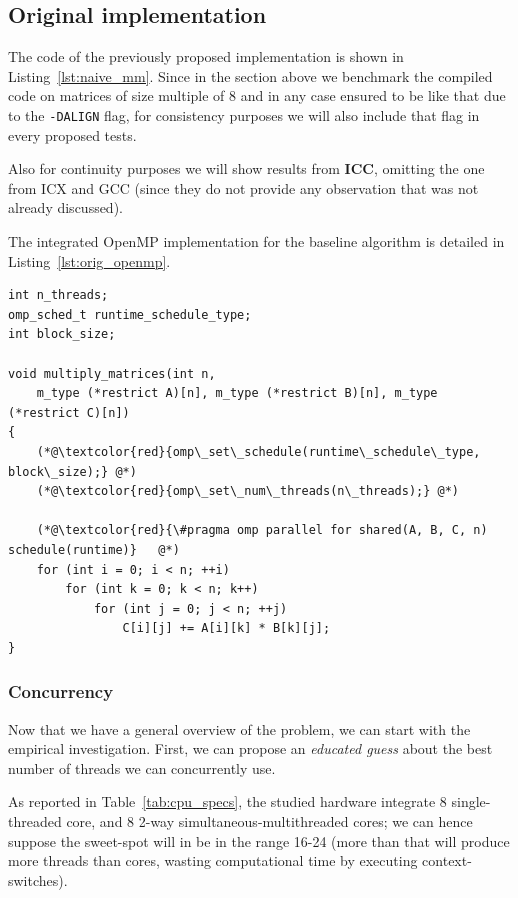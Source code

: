 \subsection{Original implementation}

The code of the previously proposed implementation is shown in Listing~\ref{lst:naive_mm}.
Since in the section above we benchmark the compiled code on matrices of size multiple of 8 and in any case ensured to be like that due to the \texttt{-DALIGN} flag, for consistency purposes we will also include that flag in every proposed tests. 

Also for continuity purposes we will show results from \textbf{ICC}, omitting the one from ICX and GCC (since they do not provide any observation  that was not already discussed).

The integrated OpenMP implementation for the baseline algorithm is detailed in Listing~\ref{lst:orig_openmp}.

\begin{lstlisting}[style=CStyle, caption={Original algorithm with OpenMP directives: the parametrization is managed at runtime.}, label={lst:orig_openmp}]
int n_threads;
omp_sched_t runtime_schedule_type;
int block_size;

void multiply_matrices(int n,
    m_type (*restrict A)[n], m_type (*restrict B)[n], m_type (*restrict C)[n])
{
    (*@\textcolor{red}{omp\_set\_schedule(runtime\_schedule\_type, block\_size);} @*)
    (*@\textcolor{red}{omp\_set\_num\_threads(n\_threads);} @*)
    
    (*@\textcolor{red}{\#pragma omp parallel for shared(A, B, C, n) schedule(runtime)}   @*)   
    for (int i = 0; i < n; ++i)
        for (int k = 0; k < n; k++)
            for (int j = 0; j < n; ++j)
                C[i][j] += A[i][k] * B[k][j];
}
\end{lstlisting}

\subsubsection{Concurrency}
Now that we have a general overview of the problem, we can start with the empirical investigation.
First, we can propose an \emph{educated guess} about the best number of threads we can concurrently use.

As reported in Table~\ref{tab:cpu_specs}, the studied hardware integrate 8 single-threaded core, and 8 2-way simultaneous-multithreaded cores; we can hence suppose the sweet-spot will in be in the range 16-24 (more than that will produce more threads than cores, wasting computational time by executing context-switches).

